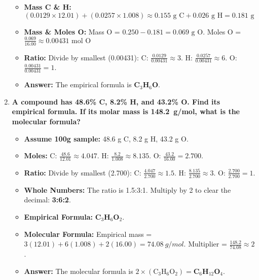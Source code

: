 \documentclass{article}
\begin{document}
\begin{enumerate}[itemsep=5pt]
\begin{itemize}
        \item \textbf{Mass C & H:} \( (0.0129 \times 12.01) + (0.0257 \times 1.008) \approx 0.155 \text{ g C} + 0.026 \text{ g H} = 0.181 \text{ g} \)
        \item \textbf{Mass & Moles O:} Mass O = \(0.250 - 0.181 = 0.069 \text{ g O}\). Moles O = \( \frac{0.069}{16.00} \approx 0.00431 \text{ mol O} \)
        \item \textbf{Ratio:} Divide by smallest (0.00431): C: \( \frac{0.0129}{0.00431} \approx 3 \). H: \( \frac{0.0257}{0.00431} \approx 6 \). O: \( \frac{0.00431}{0.00431} = 1 \).
        \item \textbf{Answer:} The empirical formula is \textbf{C\(_3\)H\(_6\)O}.
    \end{itemize}
    \item \textbf{A compound has 48.6\% C, 8.2\% H, and 43.2\% O. Find its empirical formula. If its molar mass is \SI{148.2}{g/mol}, what is the molecular formula?}
    \begin{itemize}
        \item \textbf{Assume 100g sample:} 48.6 g C, 8.2 g H, 43.2 g O.
        \item \textbf{Moles:} C: \( \frac{48.6}{12.01} \approx 4.047 \). H: \( \frac{8.2}{1.008} \approx 8.135 \). O: \( \frac{43.2}{16.00} = 2.700 \).
        \item \textbf{Ratio:} Divide by smallest (2.700): C: \( \frac{4.047}{2.700} \approx 1.5 \). H: \( \frac{8.135}{2.700} \approx 3 \). O: \( \frac{2.700}{2.700} = 1 \).
        \item \textbf{Whole Numbers:} The ratio is 1.5:3:1. Multiply by 2 to clear the decimal: \textbf{3:6:2}.
        \item \textbf{Empirical Formula:} \textbf{C\(_3\)H\(_6\)O\(_2\)}.
        \item \textbf{Molecular Formula:} Empirical mass = \(3(12.01) + 6(1.008) + 2(16.00) = \SI{74.08}{g/mol}\). Multiplier = \( \frac{148.2}{74.08} \approx 2 \).
        \item \textbf{Answer:} The molecular formula is \(2 \times (\text{C}_3\text{H}_6\text{O}_2) = \textbf{C}_6\textbf{H}_{12}\textbf{O}_4\).
    \end{itemize}
\end{enumerate}

\bigskip

\end{document}
